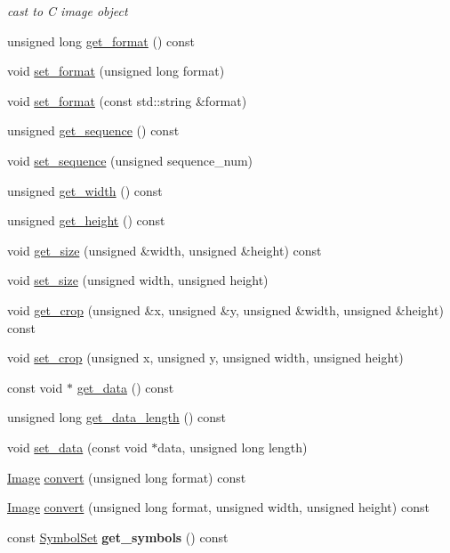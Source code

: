 \begin{DoxyCompactItemize}
\begin{DoxyCompactList}\small\item\em cast to C image object \end{DoxyCompactList}\item 
unsigned long \hyperlink{classzbar_1_1_image_ab4ae21c0be0a32dabd7082c84ff894c1}{get\_\-format} () const 
\item 
void \hyperlink{classzbar_1_1_image_afd64e442ee189ab81f407cbfb7bcd42a}{set\_\-format} (unsigned long format)
\item 
void \hyperlink{classzbar_1_1_image_a0a95c541aaabe911aa5573c5582711cf}{set\_\-format} (const std::string \&format)
\item 
unsigned \hyperlink{classzbar_1_1_image_a277419b8c40bdb5602b9f02cd80f81a8}{get\_\-sequence} () const 
\item 
void \hyperlink{classzbar_1_1_image_a4edcd85eeeb6163458810c1fe423864c}{set\_\-sequence} (unsigned sequence\_\-num)
\item 
unsigned \hyperlink{classzbar_1_1_image_a62be151b6ccb960222b01e45891a745a}{get\_\-width} () const 
\item 
unsigned \hyperlink{classzbar_1_1_image_a4632c773e1058eb7f6a2af9d7cd631c5}{get\_\-height} () const 
\item 
void \hyperlink{classzbar_1_1_image_ad6d04d9083b5c6f53d174828fb78c4a3}{get\_\-size} (unsigned \&width, unsigned \&height) const 
\item 
void \hyperlink{classzbar_1_1_image_a7d1afd590e0d2910c142ae456aa664f3}{set\_\-size} (unsigned width, unsigned height)
\item 
void \hyperlink{classzbar_1_1_image_a221bfdb4e926616cf4cfa7faae5cd0c3}{get\_\-crop} (unsigned \&x, unsigned \&y, unsigned \&width, unsigned \&height) const 
\item 
void \hyperlink{classzbar_1_1_image_a2a05b58355cd53239f32f2704f05ab8a}{set\_\-crop} (unsigned x, unsigned y, unsigned width, unsigned height)
\item 
const void $\ast$ \hyperlink{classzbar_1_1_image_a8cf6c894ab8084849fb17ecbba29cfd6}{get\_\-data} () const 
\item 
unsigned long \hyperlink{classzbar_1_1_image_a937d2c325a6e7805563355320e6b890f}{get\_\-data\_\-length} () const 
\item 
void \hyperlink{classzbar_1_1_image_a1db3cac943272e545733eb691cf225b0}{set\_\-data} (const void $\ast$data, unsigned long length)
\item 
\hyperlink{classzbar_1_1_image}{Image} \hyperlink{classzbar_1_1_image_ab2704c80d8a9767f55a21ba4467a760d}{convert} (unsigned long format) const 
\item 
\hyperlink{classzbar_1_1_image}{Image} \hyperlink{classzbar_1_1_image_ad34645aae545c0a8acde79858a948ed1}{convert} (unsigned long format, unsigned width, unsigned height) const 
\item 
\hypertarget{classzbar_1_1_image_a0f1042de13690d4d57d7358af3dd1e69}{
const \hyperlink{classzbar_1_1_symbol_set}{SymbolSet} {\bfseries get\_\-symbols} () const }
\label{classzbar_1_1_image_a0f1042de13690d4d57d7358af3dd1e69}


\end{DoxyCompactItemize}
